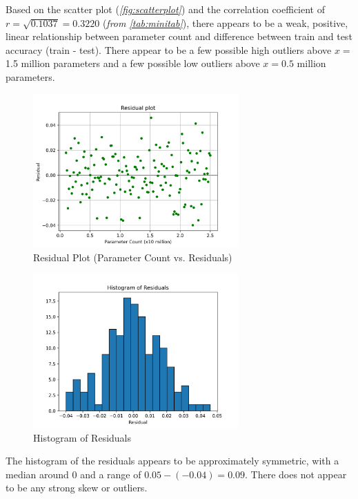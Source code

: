 \documentclass[12pt]{article}
\begin{document}
    \noindent
    Based on the scatter plot (\textit{\autoref{fig:scatterplot}}) and the correlation coefficient of $r=\sqrt{0.1037}=0.3220$ (\textit{from \autoref{tab:minitab}}), there appears to be a weak,
    positive, linear relationship between parameter count and difference between train and test accuracy (train - test).
    There appear to be a few possible high outliers above $x =$ 1.5 million parameters
    and a few possible low outliers above $x = 0.5$ million parameters.
    \begin{figure}[H]
        \centering
        \includegraphics[width=0.7\textwidth]{Images/Resid}
        \caption{Residual Plot (Parameter Count vs. Residuals)}
        \label{fig:residuals}
    \end{figure}
    \begin{figure}[H]
        \centering
        \includegraphics[width=0.7\textwidth]{Images/Resid Hist}
        \caption{Histogram of Residuals}
        \label{fig:residual_hist}
    \end{figure}
    \noindent The histogram of the residuals appears to be approximately symmetric, with a median around 0 and a range of
    $0.05-(-0.04)=0.09$. There does not appear to be any strong skew or outliers.
\end{document}
